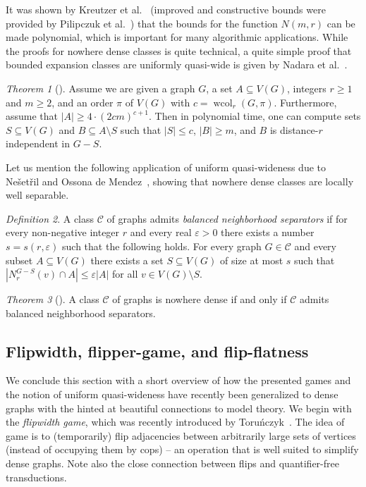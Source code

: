 \documentclass[1p,number,a4paper]{elsarticle}
\theoremstyle{remark}
\newcommand{\Cc}{\mathscr{C}}
\renewcommand{\epsilon}{\varepsilon}
\DeclareMathOperator{\wcol}{wcol}
\newtheorem{theorem}{Theorem}[section]
\newtheorem{definition}[theorem]{Definition}
\begin{document}
It was shown by Kreutzer et al.~\cite{kreutzer2018polynomial} (improved and constructive bounds were provided by Pilipczuk et al.~\cite{pilipczuk2018number}) that the bounds for the function $N(m,r)$ can be made polynomial, which is important for many algorithmic applications. 
While the proofs for nowhere dense classes is quite technical, a quite simple proof that bounded expansion classes are uniformly quasi-wide is given by Nadara et al.~\cite{nadara2019empirical}. 

\begin{theorem}[\cite{nadara2019empirical}]
    Assume we are given a graph $G$, a set $A \subseteq V(G)$,
    integers $r \geq 1$ and $m \geq 2$, and an order $\pi$ of $V(G)$ with
    $c = \wcol_r(G,\pi)$. 
    Furthermore, assume that
    $|A| \geq 4\cdot (2cm)^{c+1}$. 
    Then in polynomial time, one can compute sets $S \subseteq V(G)$
    and $B \subseteq A \setminus S$ such that $|S| \leq c$, $|B| \geq m$, and $B$ 
    is distance-$r$ independent in $G-S$.
\end{theorem}

Let us mention the following application of uniform quasi-wideness due to Ne\v{s}et\v{r}il and Ossona de Mendez~\cite{nevsetvril2016structural}, showing that nowhere dense classes are locally well separable. 

\begin{definition}
A class $\Cc$ of graphs admits \emph{balanced neighborhood separators} if for every non-negative integer $r$ and every real $\epsilon>0$ there exists a number $s=s(r,\epsilon)$ such that the following holds. For every
graph $G\in \Cc$ and every subset $A\subseteq V(G)$ there exists a set $S\subseteq V(G)$ of size at most $s$ such that $|N_r^{G-S}(v)\cap A|\leq \epsilon |A|$ for all $v\in V(G)\setminus S$. 
\end{definition}

\begin{theorem}[\cite{nevsetvril2016structural}]
A class $\Cc$ of graphs is nowhere dense if and only if $\Cc$ admits balanced
neighborhood separators.
\end{theorem}


\subsection{Flipwidth, flipper-game, and flip-flatness}

We conclude this section with a short overview of how the presented games and the notion of uniform quasi-wideness have recently been generalized to dense graphs with the hinted at beautiful connections to model theory. 
We begin with the \emph{flipwidth game}, which was recently introduced by Toru\'nczyk~\cite{torunczyk2023flip}.
The idea of game is to (temporarily) flip adjacencies between arbitrarily large sets of vertices (instead of occupying them by cops) -- an operation that is well suited to simplify dense graphs. 
Note also the close connection between flips and quantifier-free transductions. 
\end{document}

